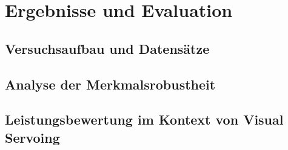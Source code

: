 \chapter{Ergebnisse und Evaluation}
\label{ch:Ergebnisse}


\section{Versuchsaufbau und Datensätze}
\label{sec:VersuchsaufbauDatensaetze}



\section{Analyse der Merkmalsrobustheit}
\label{sec:AnalyseMerkmalsrobustheit}



\section{Leistungsbewertung im Kontext von Visual Servoing}
\label{sec:Leistungsbewertung}
